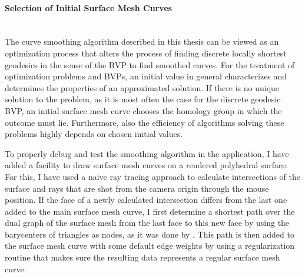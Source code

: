 \documentclass{stdlocal}
\begin{document}
  \paragraph{Selection of Initial Surface Mesh Curves}\hfill\\
  The curve smoothing algorithm described in this thesis can be viewed as an optimization process that alters the process of finding discrete locally shortest geodesics in the sense of the BVP to find smoothed curves.
  For the treatment of optimization problems and BVPs, an initial value in general characterizes and determines the properties of an approximated solution.
  If there is no unique solution to the problem, as it is most often the case for the discrete geodesic BVP, an initial surface mesh curve chooses the homology group in which the outcome must lie.
  Furthermore, also the efficiency of algorithms solving these problems highly depends on chosen initial values.

  To properly debug and test the smoothing algorithm in the application, I have added a facility to draw surface mesh curves on a rendered polyhedral surface.
  For this, I have used a naive ray tracing approach to calculate intersections of the surface and rays that are shot from the camera origin through the mouse position.
  If the face of a newly calculated intersection differs from the last one added to the main surface mesh curve, I first determine a shortest path over the dual graph of the surface mesh from the last face to this new face by using the barycenters of triangles as nodes, as it was done by \textcite{mancinelli2022}.
  This path is then added to the surface mesh curve with some default edge weights by using a regularization routine that makes sure the resulting data represents a regular surface mesh curve.
\end{document}
